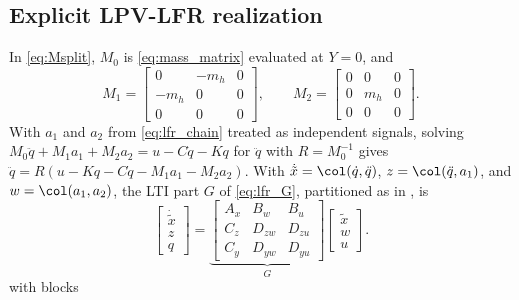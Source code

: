 \subsection{Explicit LPV-LFR realization}\label{app:lfr-details}
In \eqref{eq:Msplit}, $M_0$ is \eqref{eq:mass_matrix} evaluated at $Y=0$, and
\begin{equation*}
 M_1=\begin{bmatrix}0&-m_h&0\\-m_h&0&0\\0&0&0\end{bmatrix},\qquad
 M_2=\begin{bmatrix}0&0&0\\0&m_h&0\\0&0&0\end{bmatrix}.
\end{equation*}
With $a_1$ and $a_2$ from \eqref{eq:lfr_chain} treated as independent signals, solving
$M_0\ddot q+M_1a_1+M_2a_2=u-C\dot q-Kq$ for $\ddot q$ with $R=M_0^{-1}$ gives
$\ddot q=R(u-Kq-C\dot q-M_1a_1-M_2a_2)$. With $\dot{\tilde x}=\col(\dot q,\ddot q)$,
$z=\col(\ddot q,a_1)$, and $w=\col(a_1,a_2)$, the LTI part $G$ of
\eqref{eq:lfr_G}, partitioned as in \cite[Eq.~(6)]{drenth2025lpvlfr}, is
\begin{equation}
 \begin{bmatrix}\dot{\tilde x}\\z\\q\end{bmatrix}
 =
 \underbrace{\begin{bmatrix}
  A_x&B_w&B_u\\ C_z&D_{zw}&D_{zu}\\ C_y&D_{yw}&D_{yu}
 \end{bmatrix}}_{G}
 \begin{bmatrix}\tilde x\\w\\u\end{bmatrix}.
 \label{eq:app_G_partition}
\end{equation}
with blocks
